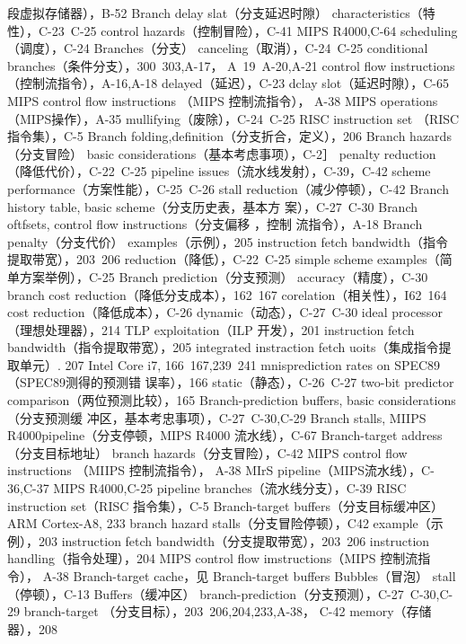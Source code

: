 段虚拟存储器），B-52
Branch delay slat（分支延迟时隙）
characteristics（特性），C-23~C-25
control hazards（控制冒险），C-41
MIPS R4000,C-64
scheduling（调度），C-24
Branches（分支）
canceling（取消），C-24~C-25
conditional branches（条件分支），300~303,A-17，
A~19~A-20,A-21
control flow instructions（控制流指令），A-16,A-18
delayed（延迟），C-23
dclay slot（延迟时隙），C-65
MIPS control flow instructions （MIPS 控制流指令），
A-38
MIPS operations（MIPS操作），A-35
mullifying（废除），C-24~C-25
RISC instruction set （RISC指令集），C-5
Branch folding,definition（分支折合，定义），206
Branch hazards（分支冒险）
basic considerations（基本考虑事项），C-2］
penalty reduction（降低代价），C-22~C-25
pipeline issues（流水线发射），C-39，C-42
scheme performance（方案性能），C-25~C-26
stall reduction（减少停顿），C-42
Branch history table, basic scheme（分支历史表，基本方
案），C-27~C-30
Branch oftfsets, control flow instructions（分支偏移 ，控制
流指令），A-18
Branch penalty（分支代价）
examples（示例），205
instruction fetch bandwidth（指令提取带宽），203~206
reduction（降低），C-22~C-25
simple scheme examples（简单方案举例），C-25
Branch prediction（分支预测）
accuracy（精度），C-30
branch cost reduction（降低分支成本），162~167
corelation（相关性），I62~164
cost reduction（降低成本），C-26
dynamic（动态），C-27~C-30
ideal processor（理想处理器），214
TLP exploitation（ILP 开发），201
instruction fetch bandwidth（指令提取带宽），205
integrated instraction fetch uoits（集成指令提取单元）.
207
Intel Core i7, 166~167,239~241
mnisprediction rates on SPEC89（SPEC89测得的预测错
误率），166
static（静态），C-26~C-27
two-bit predictor comparison（两位预测比较），165
Branch-prediction buffers, basic considerations（分支预测缓
冲区，基本考忠事项），C-27~C-30,C-29
Branch stalls, MIIPS R4000pipeline（分支停顿，MIPS R4000
流水线），C-67
Branch-target address（分支目标地址）
branch hazards（分支冒险），C-42
MIPS control flow instructions （MIIPS 控制流指令），
A-38
MIrS pipeline（MIPS流水线），C-36,C-37
MIPS R4000,C-25
pipeline branches（流水线分支），C-39
RISC instruction set（RISC 指令集），C-5
Branch-target buffers（分支目标缓冲区）
ARM Cortex-A8, 233
branch hazard stalls（分支冒险停顿），C42
example（示例），203
instruction fetch bandwidth（分支提取带宽），203~206
instruction handling（指令处理），204
MIPS control flow imstructions（MIPS 控制流指令），
A-38
Branch-target cache，见 Branch-target buffers
Bubbles（冒泡）
stall（停顿），C-13
Buffers（缓冲区）
branch-prediction（分支预测），C-27~C-30,C-29
branch-target （分支目标），203~206,204,233,A-38，
C-42
memory（存储器），208
